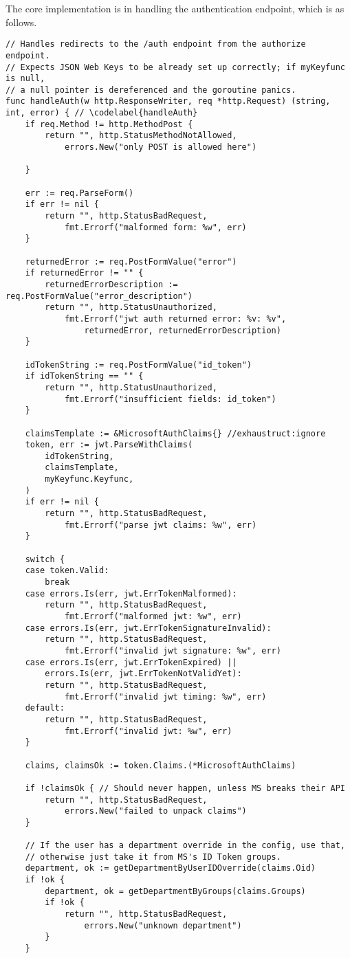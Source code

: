 The core implementation is in handling the authentication endpoint, which is as follows.

\begin{verbatim}
// Handles redirects to the /auth endpoint from the authorize endpoint.
// Expects JSON Web Keys to be already set up correctly; if myKeyfunc is null,
// a null pointer is dereferenced and the goroutine panics.
func handleAuth(w http.ResponseWriter, req *http.Request) (string, int, error) { // \codelabel{handleAuth}
	if req.Method != http.MethodPost {
		return "", http.StatusMethodNotAllowed,
			errors.New("only POST is allowed here")

	}

	err := req.ParseForm()
	if err != nil {
		return "", http.StatusBadRequest,
			fmt.Errorf("malformed form: %w", err)
	}

	returnedError := req.PostFormValue("error")
	if returnedError != "" {
		returnedErrorDescription := req.PostFormValue("error_description")
		return "", http.StatusUnauthorized,
			fmt.Errorf("jwt auth returned error: %v: %v",
				returnedError, returnedErrorDescription)
	}

	idTokenString := req.PostFormValue("id_token")
	if idTokenString == "" {
		return "", http.StatusUnauthorized,
			fmt.Errorf("insufficient fields: id_token")
	}

	claimsTemplate := &MicrosoftAuthClaims{} //exhaustruct:ignore
	token, err := jwt.ParseWithClaims(
		idTokenString,
		claimsTemplate,
		myKeyfunc.Keyfunc,
	)
	if err != nil {
		return "", http.StatusBadRequest,
			fmt.Errorf("parse jwt claims: %w", err)
	}

	switch {
	case token.Valid:
		break
	case errors.Is(err, jwt.ErrTokenMalformed):
		return "", http.StatusBadRequest,
			fmt.Errorf("malformed jwt: %w", err)
	case errors.Is(err, jwt.ErrTokenSignatureInvalid):
		return "", http.StatusBadRequest,
			fmt.Errorf("invalid jwt signature: %w", err)
	case errors.Is(err, jwt.ErrTokenExpired) ||
		errors.Is(err, jwt.ErrTokenNotValidYet):
		return "", http.StatusBadRequest,
			fmt.Errorf("invalid jwt timing: %w", err)
	default:
		return "", http.StatusBadRequest,
			fmt.Errorf("invalid jwt: %w", err)
	}

	claims, claimsOk := token.Claims.(*MicrosoftAuthClaims)

	if !claimsOk { // Should never happen, unless MS breaks their API
		return "", http.StatusBadRequest,
			errors.New("failed to unpack claims")
	}

	// If the user has a department override in the config, use that,
	// otherwise just take it from MS's ID Token groups.
	department, ok := getDepartmentByUserIDOverride(claims.Oid)
	if !ok {
		department, ok = getDepartmentByGroups(claims.Groups)
		if !ok {
			return "", http.StatusBadRequest,
				errors.New("unknown department")
		}
	}


\end{verbatim}
